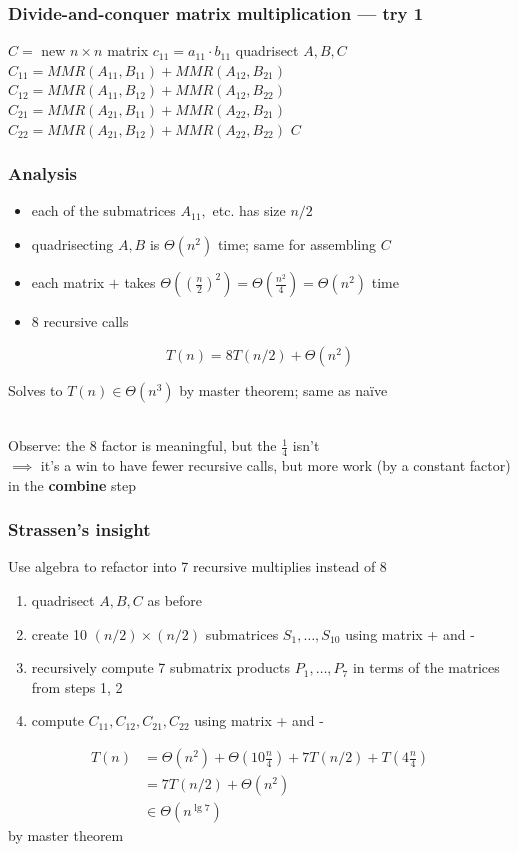\documentclass{beamer}
\newcommand{\stanza}{ \\~\ }
\begin{document}
\begin{frame} \frametitle{Divide-and-conquer matrix multiplication --- try 1}
  {
  \begin{algorithmic}[1]
    \State $C = $ new $n \times n$ matrix
      \State $c_{11} = a_{11} \cdot b_{11}$
    \Else
      \State quadrisect $A, B, C$
      \State $C_{11} = MMR(A_{11}, B_{11}) + MMR(A_{12}, B_{21})$
      \State $C_{12} = MMR(A_{11}, B_{12}) + MMR(A_{12}, B_{22})$
      \State $C_{21} = MMR(A_{21}, B_{11}) + MMR(A_{22}, B_{21})$
      \State $C_{22} = MMR(A_{21}, B_{12}) + MMR(A_{22}, B_{22})$
    \EndIf
    \State \Return $C$
    \EndFunction
  \end{algorithmic}
  }
\end{frame}

\begin{frame} \frametitle{Analysis}
\begin{itemize}
  \item each of the submatrices $A_{11},$ etc. has size $n/2$
  \item quadrisecting $A, B$ is $\Theta(n^2)$ time; same for assembling $C$
  \item each matrix $+$ takes $\Theta( (\frac{n}{2})^2 ) = \Theta(\frac{n^2}{4}) = \Theta(n^2)$ time
  \item 8 recursive calls
\end{itemize}
\[ T(n) = 8 T(n/2) + \Theta(n^2) \]

Solves to $T(n) \in \Theta(n^3)$ by master theorem; same as na\"ive \stanza

Observe: the 8 factor is meaningful, but the $\frac{1}{4}$ isn't \\
$\implies$ it's a win to have fewer recursive calls, but more work (by a
constant factor) in the \textbf{combine} step
\end{frame}

\begin{frame} \frametitle{Strassen's insight}
Use algebra to refactor into 7 recursive multiplies instead of 8
\begin{enumerate}
  \item quadrisect $A, B, C$ as before
  \item create 10 $(n/2) \times (n/2)$ submatrices $S_1, \ldots, S_{10}$ using
    matrix + and -
  \item recursively compute 7 submatrix products $P_1, \ldots, P_7$ in terms of
    the matrices from steps 1, 2
  \item compute $C_{11}, C_{12}, C_{21}, C_{22}$ using matrix + and -
\end{enumerate}
\begin{align*}
  T(n) &= \Theta(n^2) + \Theta(10 \frac{n}{4}) + 7 T(n/2) + T(4 \frac{n}{4}) \\
       &= 7 T(n/2) + \Theta(n^2) \\
       &\in \Theta(n^{\lg 7})
\end{align*}
by master theorem
\end{frame}
\end{document}
